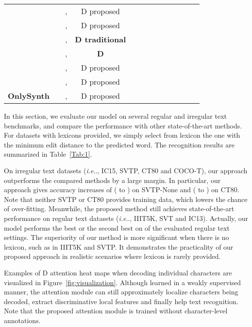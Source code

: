 \documentclass[letterpaper]{article} \usepackage{aaai19}  \usepackage{times}  \usepackage{helvet}  \usepackage{courier}  \usepackage{url}  \usepackage{graphicx}  \usepackage{amsmath}
\makeatletter
\DeclareRobustCommand\onedot{\futurelet\@let@token\@onedot}
\def\@onedot{\ifx\@let@token.\else.\null\fi\xspace}
\def\ie{\emph{i.e}\onedot} \def\Ie{\emph{I.e}\onedot}
\makeatother
\begin{document}
\begin{table*}[th!]
\begin{center}
{\begin{tabular}{c|c|c|c|c|c|c|c|c|c|c|c|c}
			 &  &,  & D proposed &  &  &  &  &  &  &  &  & \\
			&  &,  & D proposed &  &   & &  &  &  &  &  & \\
				\cline{2-13}
			&  &,  & \bf{D traditional} &  &  &  &  &  &  &  &  &\\
		   &  &,  & \bf{D}  &  &  &  &  &   &  &  &  & \\
				\cline{2-13}
			 &  &,  & D proposed &  &  &  &  &  &  &  & &  \\
			 &  &,  & D proposed &  &  &  &  &  &  &  &  &  \\
			\hline
			\textbf{OnlySynth} &  &,  & D proposed &  &  &  &  &  &  & &  &  \\
			\hline
		\end{tabular}
		}

	\end{center}
\end{table*}

In this section, we evaluate our model on several regular and irregular text benchmarks, and compare the performance with other state-of-the-art methods.
For datasets with lexicons provided, we simply select from lexicon the one with the minimum edit distance to the predicted word.
The recognition results are summarized in Table~\ref{Tab:1}.

On irregular text datasets (\ie, IC15, SVTP, CT80 and COCO-T),
our approach outperforms the compared methods by a large margin.
In particular, our approach gives accuracy increases of  ( to ) on SVTP-None and  ( to ) on CT80.
Note that neither SVTP or CT80 provides training data, which lowers the chance of over-fitting.
Meanwhile, the proposed method still achieves state-of-the-art performance on regular text datasets (\ie, IIIT5K, SVT and IC13).
Actually, our model performs the best or the second best on  of the  evaluated regular text settings.
The superiority of our method is more significant when there is no lexicon, such as in IIIT5K and SVTP.
It demonstrates the practicality of our proposed approach in realistic scenarios where lexicon is rarely provided.


Examples of D attention heat maps when decoding individual characters are visualized in Figure~\ref{fig:visualization}.
Although learned in a weakly supervised manner, the attention module can still approximately localize characters being decoded,
extract discriminative local features and finally help text recognition. Note that the proposed attention module is trained without character-level annotations.
\end{document}
